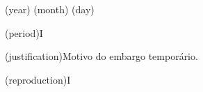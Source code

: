 

\ulfmvdocemxadate(year){}
\ulfmvdocemxadate(month){}
\ulfmvdocemxadate(day){}


\ulfmvavailability(period){I}

\ulfmvavailability(justification){Motivo do embargo temporário.}

\ulfmvavailability(reproduction){I}
